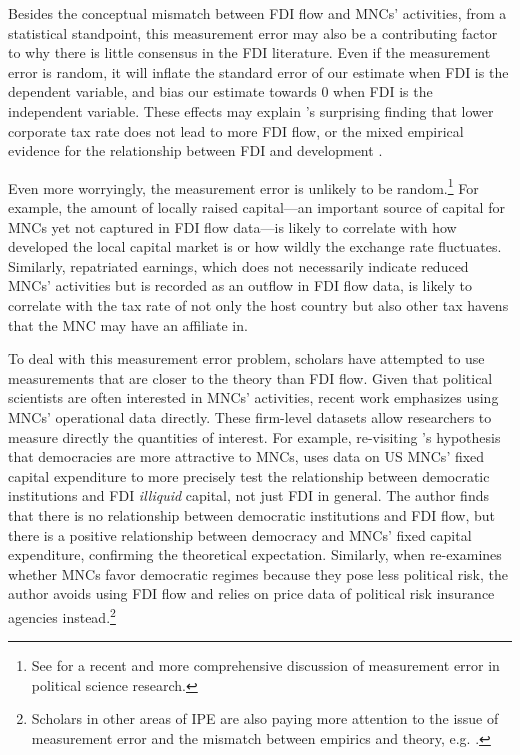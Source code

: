 Besides the conceptual mismatch between FDI flow and MNCs' activities, from a
statistical standpoint, this measurement error may also be a contributing factor
to why there is little consensus in the FDI literature. Even if the measurement
error is random, it will inflate the standard error of our estimate when FDI is
the dependent variable, and bias our estimate towards 0 when FDI is the
independent variable. These effects may explain \citet{Jensen2012}'s surprising
finding that lower corporate tax rate does not lead to more FDI flow, or the
mixed empirical evidence for the relationship between FDI and development
\citep[108]{Mold2004}.

Even more worryingly, the measurement error is unlikely to be
random.\footnote{See \citet{Gallop2017} for a recent and more comprehensive
  discussion of measurement error in political science research.} For example,
the amount of locally raised capital---an important source of capital for MNCs
yet not captured in FDI flow data---is likely to correlate with how developed
the local capital market is or how wildly the exchange rate fluctuates.
Similarly, repatriated earnings, which does not necessarily indicate reduced
MNCs' activities but is recorded as an outflow in FDI flow data, is likely to
correlate with the tax rate of not only the host country but also other tax
havens that the MNC may have an affiliate in.

To deal with this measurement error problem, scholars have attempted to use
measurements that are closer to the theory than FDI flow. Given that political
scientists are often interested in MNCs' activities, recent work emphasizes
using MNCs' operational data directly. These firm-level datasets allow
researchers to measure directly the quantities of interest. For example,
re-visiting \citet{Li2009a}'s hypothesis that democracies are more attractive to
MNCs, \citet{Kerner2014} uses data on US MNCs' fixed capital expenditure to more
precisely test the relationship between democratic institutions and FDI
\textit{illiquid} capital, not just FDI in general. The author finds that there
is no relationship between democratic institutions and FDI flow, but there is a
positive relationship between democracy and MNCs' fixed capital expenditure,
confirming the theoretical expectation. Similarly, when \citet{Jensen2008a}
re-examines whether MNCs favor democratic regimes because they pose less
political risk, the author avoids using FDI flow and relies on price data of
political risk insurance agencies instead.\footnote{Scholars in other areas of
  IPE are also paying more attention to the issue of measurement error and the
  mismatch between empirics and theory, e.g. \citep{Karcher2013}.}


